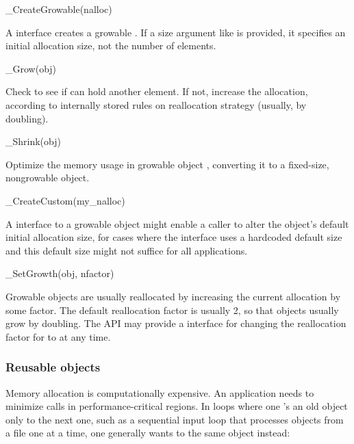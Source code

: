 \begin{sreapi}
\hypertarget{ifc:CreateGrowable}
{\item[\_CreateGrowable(nalloc)]}

A  interface creates a growable
. If a size argument like  is provided, it
specifies an initial allocation size, not the number of elements.

\hypertarget{ifc:Grow}
{\item[\_Grow(obj)]}

Check to see if  can hold another element. If not, increase
the allocation, according to internally stored rules on reallocation
strategy (usually, by doubling).

\hypertarget{ifc:Shrink}
{\item[\_Shrink(obj)]}

Optimize the memory usage in growable object , converting
it to a fixed-size, nongrowable object.

\hypertarget{ifc:CreateCustom}
{\item[\_CreateCustom(my\_nalloc)]}

A  interface to a growable object might enable
a caller to alter the object's default initial allocation size, for
cases where the  interface uses a hardcoded default
size and this default size might not suffice for all applications.

\hypertarget{ifc:SetGrowth}
{\item[\_SetGrowth(obj, nfactor)]}

Growable objects are usually reallocated by increasing the current
allocation by some factor. The default reallocation factor is usually
2, so that objects usually grow by doubling. The API may provide a
 interface for changing the reallocation factor
for  to  at any time.
\end{sreapi}




\subsubsection{Reusable objects}

Memory allocation is computationally expensive. An application needs
to minimize  calls in performance-critical
regions. In loops where one 's an old object only
to  the next one, such as a sequential input loop
that processes objects from a file one at a time, one generally wants
to  the same object instead:

